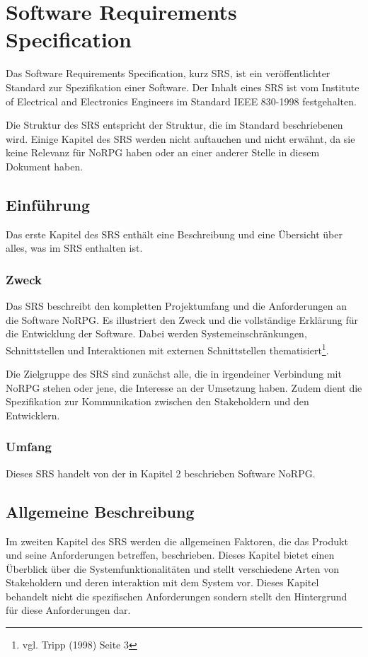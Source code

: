 \chapter{Software Requirements Specification}
	Das Software Requirements Specification, kurz SRS, ist ein veröffentlichter Standard zur Spezifikation einer Software. Der Inhalt eines SRS ist vom Institute of Electrical and Electronics Engineers im Standard IEEE 830-1998 festgehalten.
	
	Die Struktur des SRS entspricht der Struktur, die im Standard beschriebenen wird. Einige Kapitel des SRS werden nicht auftauchen und nicht erwähnt, da sie keine Relevanz für NoRPG haben oder an einer anderer Stelle in diesem Dokument haben.
	
\section{Einführung}
	Das erste Kapitel des SRS enthält eine Beschreibung und eine Übersicht über alles, was im SRS enthalten ist.
	
	\subsection{Zweck}
		Das SRS beschreibt den kompletten Projektumfang und die Anforderungen an die Software NoRPG. Es illustriert den Zweck und die vollständige Erklärung für die Entwicklung der Software. Dabei werden Systemeinschränkungen, Schnittstellen und Interaktionen mit externen Schnittstellen thematisiert\footnote{vgl. Tripp \cite{srsIEEE}(1998) Seite 3}. 
	
		Die Zielgruppe des SRS sind zunächst alle, die in irgendeiner Verbindung mit NoRPG stehen oder jene, die Interesse an der Umsetzung haben. Zudem dient die Spezifikation zur Kommunikation zwischen den Stakeholdern und den Entwicklern.
		
	\subsection{Umfang}
		Dieses SRS handelt von der in Kapitel 2 beschrieben Software NoRPG. 
		
\section{Allgemeine Beschreibung}
	Im zweiten Kapitel des SRS werden die allgemeinen Faktoren, die das Produkt und seine Anforderungen betreffen, beschrieben. Dieses Kapitel bietet einen Überblick über die Systemfunktionalitäten und stellt verschiedene Arten von Stakeholdern und deren interaktion mit dem System vor. Dieses Kapitel behandelt nicht die spezifischen Anforderungen sondern stellt den Hintergrund für diese Anforderungen dar. 


